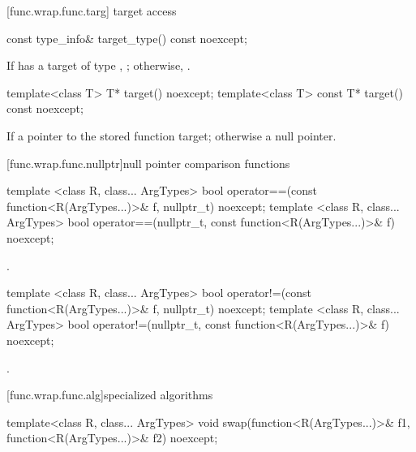 [func.wrap.func.targ]{ target access}

%
\begin{itemdecl}
const type_info& target_type() const noexcept;
\end{itemdecl}

\begin{itemdescr}
\pnum\returns If  has a target of type ,
  ; otherwise, .
\end{itemdescr}

%
\begin{itemdecl}
template<class T>       T* target() noexcept;
template<class T> const T* target() const noexcept;
\end{itemdecl}

\begin{itemdescr}
\pnum\returns If 
a pointer to the stored function target; otherwise a null pointer.
\end{itemdescr}

[func.wrap.func.nullptr]{null pointer comparison functions}

%
\begin{itemdecl}
template <class R, class... ArgTypes>
  bool operator==(const function<R(ArgTypes...)>& f, nullptr_t) noexcept;
template <class R, class... ArgTypes>
  bool operator==(nullptr_t, const function<R(ArgTypes...)>& f) noexcept;
\end{itemdecl}

\begin{itemdescr}
\pnum\returns {}.
\end{itemdescr}

%
\begin{itemdecl}
template <class R, class... ArgTypes>
  bool operator!=(const function<R(ArgTypes...)>& f, nullptr_t) noexcept;
template <class R, class... ArgTypes>
  bool operator!=(nullptr_t, const function<R(ArgTypes...)>& f) noexcept;
\end{itemdecl}

\begin{itemdescr}
\pnum\returns {}.
\end{itemdescr}

[func.wrap.func.alg]{specialized algorithms}

%
\begin{itemdecl}
template<class R, class... ArgTypes>
  void swap(function<R(ArgTypes...)>& f1, function<R(ArgTypes...)>& f2) noexcept;
\end{itemdecl}

